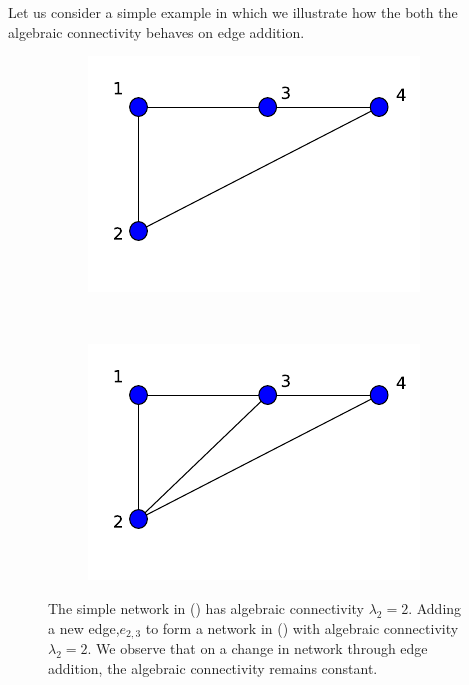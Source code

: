 \documentclass[10pt,a4paper]{article}
\theoremstyle{plain}
\theoremstyle{definition}
\begin{document}
\begin{enumerate}
		Let us consider a simple example in which we illustrate how the both the algebraic connectivity behaves on edge addition. 
		\begin{figure}[!h]
			\centering
			\begin{subfigure}[b]{0.3\textwidth}
				\includegraphics[width=\textwidth]{images/lap-algebraic.pdf}
				\caption{}
				\label{algebraic1}
			\end{subfigure}~
			\begin{subfigure}[b]{0.3\textwidth}
				\includegraphics[width= \textwidth]{images/lap-algebraic2.pdf}
				\caption{}
				\label{algebraic2}
			\end{subfigure}
			\caption{The simple network in () has algebraic connectivity $\lambda_2 = 2$. Adding a new edge,$e_{2,3}$ to form a network in () with algebraic connectivity $\lambda_2 = 2$. We observe that on a change in network through edge addition, the algebraic connectivity remains constant.}
			\label{}
		\end{figure}
	

\end{enumerate}
\end{document}
